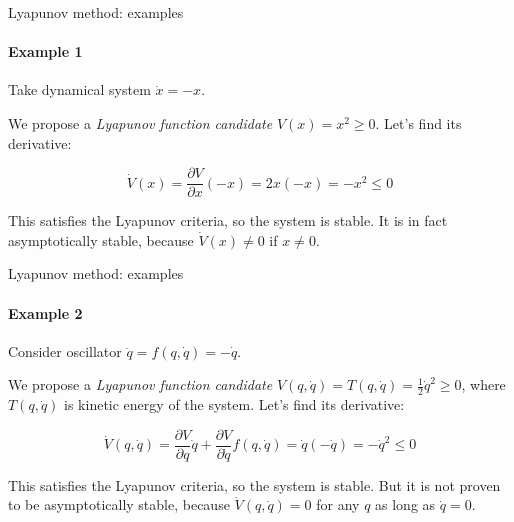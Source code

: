 \documentclass{beamer}
\begin{document}
\begin{frame}{Lyapunov method: examples}
\framesubtitle{Example 1}
\begin{flushleft}

Take dynamical system $\dot{x} = -x$. 

\bigskip

We propose a \emph{Lyapunov function candidate} $V(x) = x^2 \geq 0$. Let's find its derivative:

\begin{equation}
    \dot V(x) = \frac{\partial V}{\partial x} (-x) = 2x (-x) = -x^2 \leq 0
\end{equation}

This satisfies the Lyapunov criteria, so the system is stable. It is in fact asymptotically stable, because $\dot V(x) \neq 0$ if $x \neq 0$.

\end{flushleft}
\end{frame}



\begin{frame}{Lyapunov method: examples}
\framesubtitle{Example 2}
\begin{flushleft}

Consider oscillator $\ddot{q} = f(q, \dot{q}) = -\dot{q}$. 

\bigskip

We propose a \emph{Lyapunov function candidate} $V(q, \dot{q}) = T(q, \dot{q}) = \frac{1}{2} \dot{q}^2 \geq 0$, where $T(q, \dot{q})$ is kinetic energy of the system. Let's find its derivative:

\begin{equation}
    \dot V(q, \dot{q}) = 
    \frac{\partial V}{\partial q}       \dot{q} +
    \frac{\partial V}{\partial \dot{q}} f(q, \dot{q}) = 
    \dot{q} (-\dot{q}) = -\dot{q}^2 \leq 0
\end{equation}


This satisfies the Lyapunov criteria, so the system is stable. But it is not proven to be asymptotically stable, because $\dot V(q, \dot{q}) = 0$ for any $q$ as long as $\dot{q} = 0$.

\end{flushleft}
\end{frame}
\end{document}
